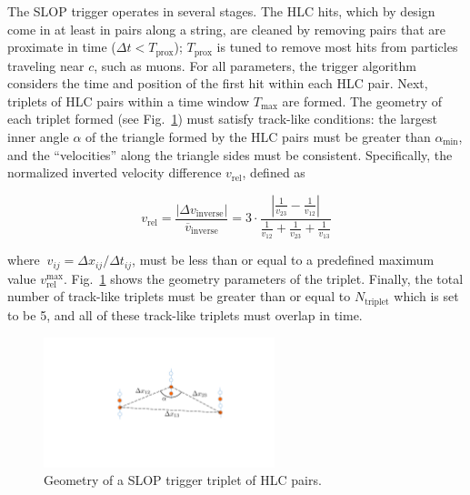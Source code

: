 The SLOP trigger operates in several stages.  The HLC hits, which by design
come in at least in pairs along a string, are cleaned by removing pairs that
are proximate in time ($\Delta t < T_{\mathrm{prox}}$); $T_{\mathrm{prox}}$
is tuned to remove most hits from particles traveling near $c$, such as muons.
For all parameters, the trigger algorithm considers the time and 
position of the first hit within each HLC pair.  Next, triplets of HLC
pairs within a time window $T_{\mathrm{max}}$ 
are formed.  The geometry of each triplet formed (see Fig.~\ref{fig:slop})
must satisfy track-like 
conditions: the largest inner angle $\alpha$ of the triangle formed by the
HLC pairs must be greater than $\alpha_{\mathrm{min}}$, and the
``velocities'' along the triangle sides must be consistent.  Specifically,
the normalized inverted velocity difference $v_\mathrm{rel}$, defined as

\begin{equation}
  v_\mathrm{rel}=\frac{|\Delta
  v_\mathrm{inverse}|}{\overline{v}_\mathrm{inverse}} = 
  3\cdot\frac{|\frac{1}{v_{23}}-\frac{1}{v_{12}}|}
  {\frac{1}{v_{12}}+\frac{1}{v_{23}}+\frac{1}{v_{13}}}
\end{equation}

\noindent where $\ v_{ij} = \Delta x_{ij}/\Delta t_{ij}$, must be less than
or equal to a predefined maximum value
$v_{\mathrm{rel}}^{\mathrm{max}}$.  Fig.~\ref{fig:slop} shows the geometry
parameters of the triplet.  Finally, the total number of track-like triplets
must be greater than or equal to $N_{\mathrm{triplet}}$ which is set to
be 5, and all of these track-like triplets must overlap in time. 

\begin{figure}[!ht]
 \centering
 \includegraphics[width=0.6\textwidth]{graphics/online/trigger/slop.pdf}
 \caption{Geometry of a SLOP trigger triplet of HLC pairs.}
 \label{fig:slop}
\end{figure}


